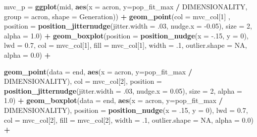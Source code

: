 \documentclass[]{book}
\newenvironment{Shaded}{\begin{snugshade}}{\end{snugshade}}
\newcommand{\DataTypeTok}[1]{\textcolor[rgb]{0.13,0.29,0.53}{#1}}
\newcommand{\DecValTok}[1]{\textcolor[rgb]{0.00,0.00,0.81}{#1}}
\newcommand{\FloatTok}[1]{\textcolor[rgb]{0.00,0.00,0.81}{#1}}
\newcommand{\KeywordTok}[1]{\textcolor[rgb]{0.13,0.29,0.53}{\textbf{#1}}}
\newcommand{\NormalTok}[1]{#1}
\newcommand{\OperatorTok}[1]{\textcolor[rgb]{0.81,0.36,0.00}{\textbf{#1}}}
\newcommand{\OtherTok}[1]{\textcolor[rgb]{0.56,0.35,0.01}{#1}}
\newcommand{\StringTok}[1]{\textcolor[rgb]{0.31,0.60,0.02}{#1}}
\begin{document}
\begin{Shaded}
\begin{Highlighting}[]
{\NormalTok{mvc_p =}\StringTok{ }\KeywordTok{ggplot}\NormalTok{(mid, }\KeywordTok{aes}\NormalTok{(}\DataTypeTok{x =}\NormalTok{ acron, }\DataTypeTok{y=}\NormalTok{pop_fit_max }\OperatorTok{/}\StringTok{ }\NormalTok{DIMENSIONALITY, }\DataTypeTok{group =}\NormalTok{ acron, }\DataTypeTok{shape =}\NormalTok{ Generation)) }\OperatorTok{+}
\StringTok{  }\KeywordTok{geom_point}\NormalTok{(}\DataTypeTok{col =}\NormalTok{ mvc_col[}\DecValTok{1}\NormalTok{] , }\DataTypeTok{position =} \KeywordTok{position_jitternudge}\NormalTok{(}\DataTypeTok{jitter.width =} \FloatTok{.03}\NormalTok{, }\DataTypeTok{nudge.x =} \FloatTok{-0.05}\NormalTok{), }\DataTypeTok{size =} \DecValTok{2}\NormalTok{, }\DataTypeTok{alpha =} \FloatTok{1.0}\NormalTok{) }\OperatorTok{+}
\StringTok{  }\KeywordTok{geom_boxplot}\NormalTok{(}\DataTypeTok{position =} \KeywordTok{position_nudge}\NormalTok{(}\DataTypeTok{x =} \FloatTok{-.15}\NormalTok{, }\DataTypeTok{y =} \DecValTok{0}\NormalTok{), }\DataTypeTok{lwd =} \FloatTok{0.7}\NormalTok{, }\DataTypeTok{col =}\NormalTok{ mvc_col[}\DecValTok{1}\NormalTok{], }\DataTypeTok{fill =}\NormalTok{ mvc_col[}\DecValTok{1}\NormalTok{], }\DataTypeTok{width =} \FloatTok{.1}\NormalTok{, }\DataTypeTok{outlier.shape =} \OtherTok{NA}\NormalTok{, }\DataTypeTok{alpha =} \FloatTok{0.0}\NormalTok{) }\OperatorTok{+}

\StringTok{  }\KeywordTok{geom_point}\NormalTok{(}\DataTypeTok{data =}\NormalTok{ end, }\KeywordTok{aes}\NormalTok{(}\DataTypeTok{x =}\NormalTok{ acron, }\DataTypeTok{y=}\NormalTok{pop_fit_max }\OperatorTok{/}\StringTok{ }\NormalTok{DIMENSIONALITY), }\DataTypeTok{col =}\NormalTok{ mvc_col[}\DecValTok{2}\NormalTok{], }\DataTypeTok{position =} \KeywordTok{position_jitternudge}\NormalTok{(}\DataTypeTok{jitter.width =} \FloatTok{.03}\NormalTok{, }\DataTypeTok{nudge.x =} \FloatTok{0.05}\NormalTok{), }\DataTypeTok{size =} \DecValTok{2}\NormalTok{, }\DataTypeTok{alpha =} \FloatTok{1.0}\NormalTok{) }\OperatorTok{+}
\StringTok{  }\KeywordTok{geom_boxplot}\NormalTok{(}\DataTypeTok{data =}\NormalTok{ end, }\KeywordTok{aes}\NormalTok{(}\DataTypeTok{x =}\NormalTok{ acron, }\DataTypeTok{y=}\NormalTok{pop_fit_max }\OperatorTok{/}\StringTok{ }\NormalTok{DIMENSIONALITY), }\DataTypeTok{position =} \KeywordTok{position_nudge}\NormalTok{(}\DataTypeTok{x =} \FloatTok{.15}\NormalTok{, }\DataTypeTok{y =} \DecValTok{0}\NormalTok{), }\DataTypeTok{lwd =} \FloatTok{0.7}\NormalTok{, }\DataTypeTok{col =}\NormalTok{ mvc_col[}\DecValTok{2}\NormalTok{], }\DataTypeTok{fill =}\NormalTok{ mvc_col[}\DecValTok{2}\NormalTok{], }\DataTypeTok{width =} \FloatTok{.1}\NormalTok{, }\DataTypeTok{outlier.shape =} \OtherTok{NA}\NormalTok{, }\DataTypeTok{alpha =} \FloatTok{0.0}\NormalTok{) }\OperatorTok{+}

}
\end{Highlighting}
\end{Shaded}
\end{document}
